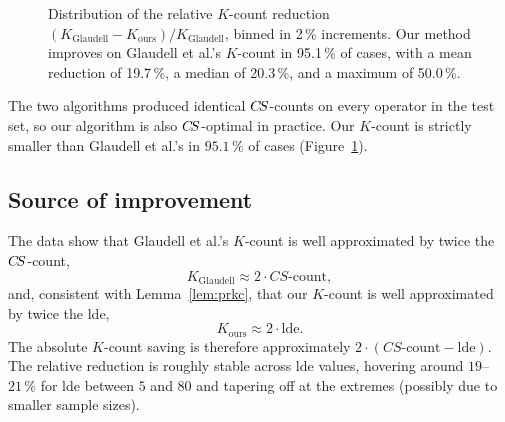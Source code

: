 \documentclass[reprint,amsmath,amssymb,aps,pra]{revtex4-2}
\begin{document}
\begin{figure}
  \centering
  \caption{Distribution of the relative $K$-count reduction
    $(K_{\mathrm{Glaudell}} - K_{\mathrm{ours}}) /
    K_{\mathrm{Glaudell}}$, binned in 2\,\% increments. Our method
    improves on Glaudell et al.'s $K$-count in 95.1\,\% of cases, with
    a mean reduction of 19.7\,\%, a median of 20.3\,\%, and a maximum
    of 50.0\,\%.}
  \label{fig:k-reduction-dist}
\end{figure}

The two algorithms produced identical $C\kern-.16667em S$-counts on every operator
in the test set, so our algorithm is also $C\kern-.16667em S$-optimal in practice.
Our $K$-count is strictly smaller than Glaudell et al.'s in $95.1\,\%$
of cases (Figure~\ref{fig:k-reduction-dist}).


\subsection{Source of improvement}
The data show that Glaudell et al.'s $K$-count is well approximated by
twice the $C\kern-.16667em S$-count,
\[
  K_{\mathrm{Glaudell}} \approx 2 \cdot \mathit{CS}\text{-count},
\]
and, consistent with Lemma~\ref{lem:prkc}, that our $K$-count is well
approximated by twice the lde,
\[
  K_{\mathrm{ours}} \approx 2 \cdot \mathrm{lde}.
\]
The absolute $K$-count saving is therefore approximately
$2 \cdot (\mathit{CS}\text{-count} - \mathrm{lde})$. The relative
reduction is roughly stable across lde values, hovering around
$19$--$21\,\%$ for lde between $5$ and $80$ and tapering off at the
extremes (possibly due to smaller sample sizes).
\end{document}
